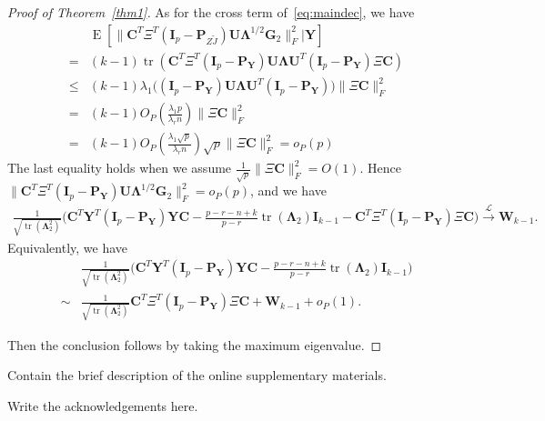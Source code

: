 \documentclass[12pt]{article} %
\DeclareMathOperator{\mytr}{tr}
\DeclareMathOperator{\myE}{E}
\newcommand{\bP}{\mathbf{P}}
\newcommand{\bY}{\mathbf{Y}}
\newcommand{\bG}{\mathbf{G}}
\newcommand{\bC}{\mathbf{C}}
\newcommand{\bI}{\mathbf{I}}
\newcommand{\bU}{\mathbf{U}}
\newcommand{\bW}{\mathbf{W}}
\newcommand{\bfsym}[1]{\ensuremath{\boldsymbol{#1}}}
\def\bLambda {\bfsym {\Lambda}}
\theoremstyle{definition}
\begin{document}
\begin{proof}[\textrm{Proof of Theorem~\ref{thm1}}]
As for the cross term of~\eqref{eq:maindec}, we have
$$
\begin{aligned}
    &\myE [\|\bC^T \Xi^T (\bI_p -\bP_{Z\tilde{J}})\bU\bLambda^{1/2}\bG_2\|_F^2|\bY]\\
    = &
    (k-1)\mytr(\bC^T \Xi^T (\bI_p -\bP_{\bY})\bU\bLambda \bU^T (\bI_p -\bP_{\bY})\Xi \bC)\\
    \leq &
    (k-1)\lambda_1\big((\bI_p -\bP_{\bY})\bU\bLambda \bU^T (\bI_p -\bP_{\bY})\big)\|\Xi \bC\|^2_F\\
    = &
    (k-1) O_P(\frac{\lambda_1 p}{\lambda_r n})  \|\Xi \bC\|^2_F\\
    = &
    (k-1) O_P(\frac{\lambda_1 \sqrt{p}}{\lambda_r n}) \sqrt{p}  \|\Xi \bC\|^2_F=o_P(p)
\end{aligned}
$$
The last equality holds when we assume $\frac{1}{\sqrt{p}}\|\Xi \bC\|_F^2=O(1)$.
Hence $\|\bC^T \Xi^T (\bI_p -\bP_{\bY})\bU\bLambda^{1/2}\bG_2\|_F^2=o_P(p)$, and we have
$$
\begin{aligned}
\frac{1}{\sqrt{\mytr(\bLambda_2^2)}}
    \big( \bC^T\bY^T(\bI_p-\bP_{\bY}) \bY \bC
    -\tfrac{p-r-n+k}{p-r}\mytr(\bLambda_2)\bI_{k-1} -\bC^T \Xi^T (\bI_p-\bP_{\bY})\Xi \bC\big)
\xrightarrow{\mathcal{L}} \bW_{k-1}.
\end{aligned}
$$
    Equivalently, we have
    $$
    \begin{aligned}
        &\frac{1}{\sqrt{\mytr(\bLambda_2^2)}} {\Big(\bC^T\bY^T(\bI_p-\bP_{\bY}) \bY \bC- \frac{p-r-n+k}{p-r}\mytr(\bLambda_2)\bI_{k-1}}\Big)\\
        \sim&
\frac{1}{\sqrt{\mytr(\bLambda_2^2)}} \bC^T \Xi^T (\bI_p-\bP_{\bY})\Xi \bC
        +\bW_{k-1}+o_P(1).
    \end{aligned}
    $$

    Then the conclusion follows by taking the maximum eigenvalue.
\end{proof}

\vskip 14pt

Contain
the brief description of the online supplementary materials.
\par
\vskip 14pt

Write the acknowledgements here.
\par
\end{document}
